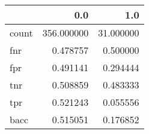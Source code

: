\begin{tabular}{lrr}
\toprule
{} &         0.0 &        1.0 \\
\midrule
count &  356.000000 &  31.000000 \\
fnr   &    0.478757 &   0.500000 \\
fpr   &    0.491141 &   0.294444 \\
tnr   &    0.508859 &   0.483333 \\
tpr   &    0.521243 &   0.055556 \\
bacc  &    0.515051 &   0.176852 \\
\bottomrule
\end{tabular}
